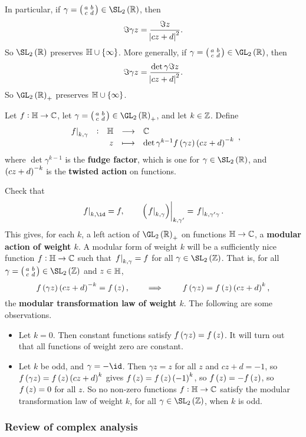 In particular, if $ \gamma = \twobytwosmall{a}{b}{c}{d} \in \SL_2\br{\RR} $, then
$$ \Im \gamma z = \dfrac{\Im z}{\abs{cz + d}^2}. $$
So $ \SL_2\br{\RR} $ preserves $ \HH \cup \cbr{\infty} $. More generally, if $ \gamma = \twobytwosmall{a}{b}{c}{d} \in \GL_2\br{\RR} $, then
$$ \Im \gamma z = \dfrac{\det \gamma\Im z}{\abs{cz + d}^2}. $$
So $ \GL_2\br{\RR}_+ $ preserves $ \HH \cup \cbr{\infty} $.

\begin{definition}
Let $ f : \mathbb{H} \to \mathbb{C} $, let $ \gamma = \twobytwosmall{a}{b}{c}{d} \in \GL_2\br{\RR}_+ $, and let $ k \in \mathbb{Z} $. Define
$$ \function[\eval{f}_{k, \gamma}]{\HH}{\CC}{z}{\det \gamma^{k - 1}f\br{\gamma z}\br{cz + d}^{-k}}, $$
where $ \det \gamma^{k - 1} $ is the \textbf{fudge factor}, which is one for $ \gamma \in \SL_2\br{\RR} $, and $ \br{cz + d}^{-k} $ is the \textbf{twisted action} on functions.
\end{definition}

Check that
$$ \eval{f}_{k, \id} = f, \qquad \eval{\br{\eval{f}_{k, \gamma}}}_{k, \gamma'} = \eval{f}_{k, \gamma'\gamma}. $$
This gives, for each $ k $, a left action of $ \GL_2\br{\RR}_+ $ on functions $ \mathbb{H} \to \mathbb{C} $, a \textbf{modular action of weight $ k $}. A modular form of weight $ k $ will be a sufficiently nice function $ f : \mathbb{H} \to \mathbb{C} $ such that $ \left. f \right|_{k, \gamma} = f $ for all $ \gamma \in \SL_2\br{\ZZ} $. That is, for all $ \gamma = \twobytwosmall{a}{b}{c}{d} \in \SL_2\br{\ZZ} $ and $ z \in \mathbb{H} $,
$$ f\br{\gamma z}\br{cz + d}^{-k} = f\br{z}, \qquad \implies \qquad f\br{\gamma z} = f\br{z}\br{cz + d}^k, $$
the \textbf{modular transformation law of weight $ k $}. The following are some observations.
\begin{itemize}
\item Let $ k = 0 $. Then constant functions satisfy $ f\br{\gamma z} = f\br{z} $. It will turn out that all functions of weight zero are constant.
\item Let $ k $ be odd, and $ \gamma = -\id $. Then $ \gamma z = z $ for all $ z $ and $ cz + d = -1 $, so $ f\br{\gamma z} = f\br{z}\br{cz + d}^k $ gives $ f\br{z} = f\br{z}\br{-1}^k $, so $ f\br{z} = -f\br{z} $, so $ f\br{z} = 0 $ for all $ z $. So no non-zero functions $ f : \mathbb{H} \to \mathbb{C} $ satisfy the modular transformation law of weight $ k $, for all $ \gamma \in \SL_2\br{\ZZ} $, when $ k $ is odd.
\end{itemize}

\pagebreak

\subsubsection{Review of complex analysis}

